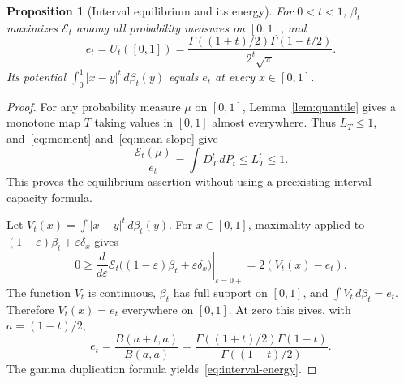 \documentclass[11pt]{article}
\newtheorem{proposition}[theorem]{Proposition}
\theoremstyle{remark}
\newcommand{\dd}{\,d}
\begin{document}
\begin{proposition}[Interval equilibrium and its energy]\label{prop:interval}
For $0<t<1$, $\beta_t$ maximizes $\mathcal E_t$ among all probability
measures on $[0,1]$, and
\begin{equation}\label{eq:interval-energy}
 e_t=U_t([0,1])
 =\frac{\Gamma((1+t)/2)\Gamma(1-t/2)}{2^t\sqrt\pi}.
\end{equation}
Its potential $\int_0^1|x-y|^t\dd\beta_t(y)$ equals $e_t$ at every
$x\in[0,1]$.
\end{proposition}

\begin{proof}
For any probability measure $\mu$ on $[0,1]$, Lemma~\ref{lem:quantile}
gives a monotone map $T$ taking values in $[0,1]$ almost everywhere.
Thus $L_T\leq1$, and~\eqref{eq:moment} and~\eqref{eq:mean-slope} give
\[
 \frac{\mathcal E_t(\mu)}{e_t}
 =\int D_T^t\dd P_t\leq L_T^t\leq1.
\]
This proves the equilibrium assertion without using a preexisting
interval-capacity formula.

Let $V_t(x)=\int|x-y|^t\dd\beta_t(y)$. For $x\in[0,1]$, maximality
applied to $(1-\varepsilon)\beta_t+\varepsilon\delta_x$ gives
\[
 0\geq\left.\frac{d}{d\varepsilon}
 \mathcal E_t\bigl((1-\varepsilon)\beta_t+\varepsilon\delta_x\bigr)
 \right|_{\varepsilon=0+}=2(V_t(x)-e_t).
\]
The function $V_t$ is continuous, $\beta_t$ has full support on $[0,1]$,
and $\int V_t\dd\beta_t=e_t$. Therefore $V_t(x)=e_t$ everywhere on
$[0,1]$. At zero this gives, with $a=(1-t)/2$,
\[
 e_t=\frac{B(a+t,a)}{B(a,a)}
 =\frac{\Gamma((1+t)/2)\Gamma(1-t)}{\Gamma((1-t)/2)}.
\]
The gamma duplication formula yields~\eqref{eq:interval-energy}.
\end{proof}
\end{document}
